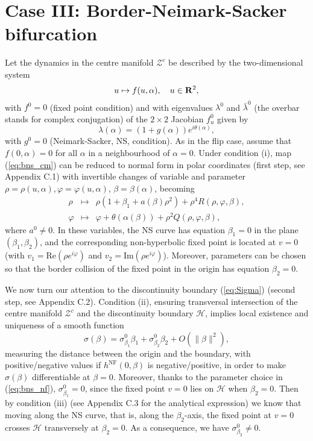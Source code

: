 \documentclass[final,onefignum]{siamltex}
\begin{document}
\section{Case III: Border-Neimark-Sacker bifurcation}
\label{sec:bns}
Let the dynamics in the centre manifold $\mathcal{Z}^c$ be described by the
two-dimensional system
\begin{equation}
\label{eq:bns_cm}
u \mapsto f(u,\alpha), \quad u\in{{\bf R}}^2,
\end{equation}
with $f^0=0$ (fixed point condition) and with eigenvalues
$\lambda^0$ and $\bar{\lambda}^0$ 
(the overbar stands for complex conjugation)
of the $2\times 2$ Jacobian $f_u^0$ given by
$$
\lambda(\alpha)=(1+g(\alpha))e^{i\theta(\alpha)},
$$
with $g^0=0$ (Neimark-Sacker, NS, condition).  As in the flip case, assume that $f(0,\alpha)=0$ for all $\alpha$ in a neighbourhood of $\alpha=0$.  Under condition (i), map (\ref{eq:bns_cm}) can be reduced to normal form in polar coordinates (first step, see Appendix C.1) with invertible changes of variable and parameter  $\rho=\rho(u,\alpha), \varphi=\varphi(u,\alpha)$, $\beta=\beta(\alpha)$, becoming
\begin{subequations}
\label{eq:bns_nf}
\begin{eqnarray}
\label{eq:bns_nf_r}
\rho & \mapsto & \rho(1+\beta_1+a(\beta)\rho^2)+\rho^4 R(\rho,\varphi,\beta),\\
\label{eq:bns_nf_p}
\varphi & \mapsto & \varphi+\theta(\alpha(\beta))+
\rho^2 Q(\rho,\varphi,\beta),
\end{eqnarray}
\end{subequations}
where $a^0\neq 0 $. In these variables, the NS curve has equation $\beta_1=0$ in the plane $(\beta_1,\beta_2)$, and the corresponding non-hyperbolic fixed point is located at $v=0$ (with $v_1=\mathrm{Re}(\rho e^{i\varphi})$ and $v_2=\mathrm{Im}(\rho e^{i\varphi})$).  Moreover, parameters can be chosen so that the border collision of the fixed point in the origin has equation $\beta_2=0$.

We now turn our attention to the discontinuity boundary (\ref{eq:Sigma}) (second step, see Appendix C.2).  Condition (ii), ensuring transversal intersection of the centre manifold $\mathcal{Z}^c$ and the discontinuity boundary $\mathcal{H}$, implies local existence and uniqueness of a smooth function
$$
\sigma(\beta)=\sigma_{\beta_1}^0\beta_1+\sigma_{\beta_2}^0\beta_2+
O(\|\beta\|^2),
$$
measuring the distance between the origin and the boundary, with positive/negative values if $h^{\mathrm{NF}}(0,\beta)$ is negative/positive, in order to make $\sigma(\beta)$ differentiable at $\beta=0$.  Moreover, thanks to the parameter choice in (\ref{eq:bns_nf}), $\sigma_{\beta_1}^0=0$, since the fixed point $v=0$ lies on $\mathcal{H}$ when $\beta_2=0$. Then by condition (iii) (see Appendix C.3 for the analytical expression) we know that moving along the NS curve, that is, along the $\beta_2$-axis, the fixed point at $v=0$ crosses $\mathcal{H}$ transversely at $\beta_2=0$.  As a consequence, we have $\sigma_{\beta_2}^0\neq0$.
\end{document}
